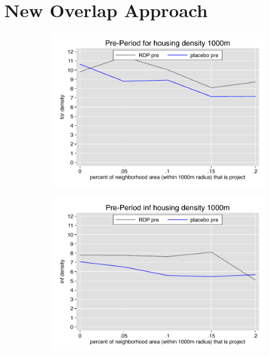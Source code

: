 \documentclass[12pt]{article}
\begin{document}
\section{New Overlap Approach}
\begin{figure}
        \begin{subfigure}[b]{0.495\textwidth}
            \centering
            \includegraphics[width=\textwidth,trim={0.3cm .3cm 0.1cm 0cm}, clip=true]{figures/overlap_for_1000_total_pre.pdf}
        \end{subfigure}
        \hfill
        \begin{subfigure}[b]{0.495\textwidth}  
            \centering 
            \includegraphics[width=\textwidth,trim={0.3cm .3cm 0.1cm 0cm}, clip=true]{figures/overlap_inf_1000_total_pre.pdf}

\end{subfigure}
\end{figure}
\end{document}
